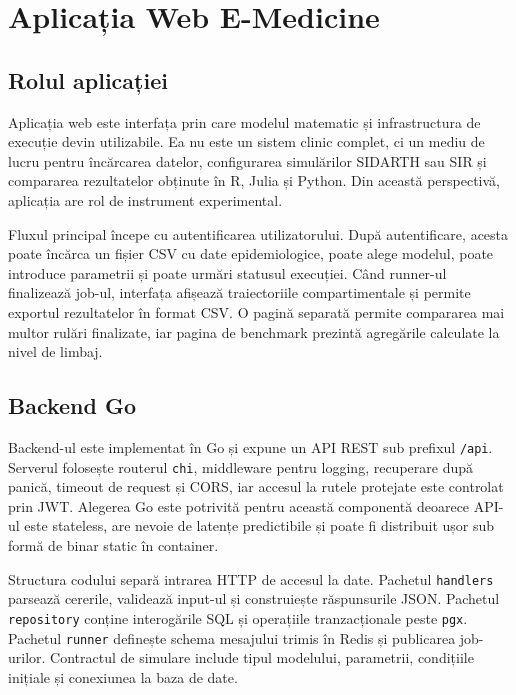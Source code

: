 
\chapter{Aplicația Web E-Medicine}
\label{ch:aplicatie}

\section{Rolul aplicației}
\label{sec:functionalitati}

Aplicația web este interfața prin care modelul matematic și infrastructura de
execuție devin utilizabile. Ea nu este un sistem clinic complet, ci un mediu de
lucru pentru încărcarea datelor, configurarea simulărilor SIDARTH sau SIR și
compararea rezultatelor obținute în R, Julia și Python. Din această perspectivă,
aplicația are rol de instrument experimental.

Fluxul principal începe cu autentificarea utilizatorului. După autentificare,
acesta poate încărca un fișier CSV cu date epidemiologice, poate alege modelul,
poate introduce parametrii și poate urmări statusul execuției. Când runner-ul
finalizează job-ul, interfața afișează traiectoriile compartimentale și permite
exportul rezultatelor în format CSV. O pagină separată permite compararea mai
multor rulări finalizate, iar pagina de benchmark prezintă agregările calculate la
nivel de limbaj.

\section{Backend Go}
\label{sec:backend_go}

Backend-ul este implementat în Go și expune un API REST sub prefixul
\texttt{/api}. Serverul folosește routerul \texttt{chi}, middleware pentru
logging, recuperare după panică, timeout de request și CORS, iar accesul la rutele
protejate este controlat prin JWT. Alegerea Go este potrivită pentru această
componentă deoarece API-ul este stateless, are nevoie de latențe predictibile și
poate fi distribuit ușor sub formă de binar static în container.

Structura codului separă intrarea HTTP de accesul la date. Pachetul
\texttt{handlers} parsează cererile, validează input-ul și construiește
răspunsurile JSON. Pachetul \texttt{repository} conține interogările SQL și
operațiile tranzacționale peste \texttt{pgx}. Pachetul \texttt{runner} definește
schema mesajului trimis în Redis și publicarea job-urilor. Contractul de simulare
include tipul modelului, parametrii, condițiile inițiale și conexiunea la baza de
date.

